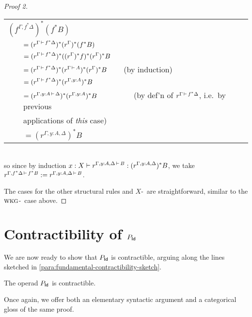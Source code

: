 \begin{proof}[Proof 2]
\noindent \begin{tabular}{ll}
\multicolumn{2}{l}{$\displaystyle (f^{\Gamma,f^*\Delta})^*(f^*B)$} \\
$\quad$ & $\displaystyle = (r^{\Gamma \,\vdash\, f^*\Delta})^*(r^\Gamma)^*(f^*B)$ \\
 & $\displaystyle = (r^{\Gamma \,\vdash\, f^*\Delta})^*((r^\Gamma)^*f)^*(r^\Gamma)^*B$ \\
 & $\displaystyle = (r^{\Gamma \,\vdash\, f^*\Delta})^*(r^{\Gamma \,\vdash\, A})^*(r^\Gamma)^*B \qquad$ \hfill (by induction) \\
 & $\displaystyle = (r^{\Gamma \,\vdash\, f^*\Delta})^*(r^{\Gamma,y:A})^*B$ \\
 & $\displaystyle = (r^{\Gamma,y:A \,\vdash\, \Delta})^*(r^{\Gamma,y:A})^*B \qquad \qquad \quad$ \hfill (by def'n of $r^{\Gamma \,\vdash\, f^*\Delta}$, i.e.\ by previous\\
 & \hfill applications of \emph{this} case)  \\
 & $\displaystyle = (r^{\Gamma,y:A,\Delta})^*B$ \\
\end{tabular}  \\
so since by induction $\displaystyle x:X \vdash r^{\Gamma,y:A,\Delta \,\vdash\, B}:(r^{\Gamma,y:A,\Delta})^*B$, we take $r^{\Gamma,f^*\Delta \,\vdash\, f^*B} := r^{\Gamma,y:A,\Delta \,\vdash\, B}$.

The cases for the other structural rules and $X$-\form\ are straightforward, similar to the $\textsc{wkg}$-\typerule\ case above. \doubleqed
\end{proof}






\section{Contractibility of \texorpdfstring{$P_{\mathsf{Id}}$}{P\_Id}}

We are now ready to show that $P_{\mathsf{Id}}$ is contractible, arguing along the lines sketched in \ref{para:fundamental-contractibility-sketch}.

\begin{theorem}\label{thm:p-is-contractible}The operad $P_{\mathsf{Id}}$ is contractible.
\end{theorem}

Once again, we offer both an elementary syntactic argument and a categorical gloss of the same proof.

